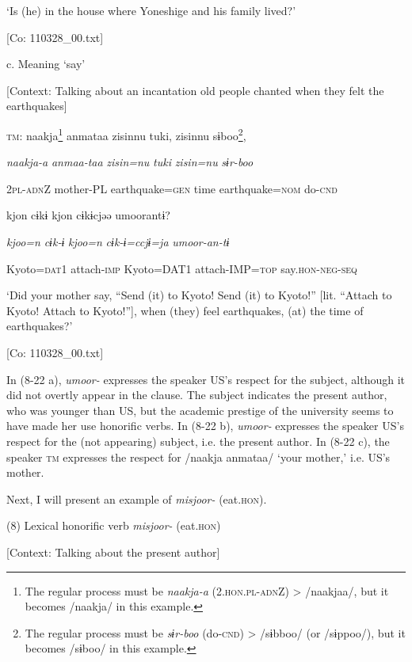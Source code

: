       ‘Is (he) in the house where Yoneshige and his family lived?’

      [Co: 110328\_00.txt]

  c.  Meaning ‘say’

    [Context: Talking about an incantation old people chanted when they felt the earthquakes]

    \textsc{tm}:  naakja\footnote{The regular process must be \textit{naakja-a} (2.\textsc{hon}.\textsc{pl}-\textsc{adn}Z) > /naakjaa/, but it becomes /naakja/ in this example.}  anmataa  zisinnu  tuki,  zisinnu  sɨboo\footnote{The regular process must be \textit{sɨr-boo} (do-\textsc{cnd}) > /sɨbboo/ (or /sɨppoo/), but it becomes /sɨboo/ in this example.},

      \textit{naakja-a}  \textit{anmaa-taa}  \textit{zisin=nu}  \textit{tuki}  \textit{zisin=nu}  \textit{sɨr-boo}

      2\textsc{pl}-\textsc{adn}Z  mother-PL  earthquake=\textsc{gen}  time  earthquake=\textsc{nom}  do-\textsc{cnd}

      kjon  cɨkɨ  kjon  cɨkɨcjəə  umoorantɨ?

      \textit{kjoo=n}  \textit{cɨk-ɨ}  \textit{kjoo=n}  \textit{cɨk-ɨ=ccjɨ=ja}  \textit{umoor{}-an-tɨ}

      Kyoto=\textsc{dat}1  attach-\textsc{imp}  Kyoto=DAT1  attach-IMP=\textsc{top}  say.\textsc{hon}-\textsc{neg}-\textsc{seq}

      ‘Did your mother say, “Send (it) to Kyoto! Send (it) to Kyoto!” [lit. “Attach to Kyoto! Attach to Kyoto!”], when (they) feel earthquakes, (at) the time of earthquakes?’

      [Co: 110328\_00.txt]

In (8-22 a), \textit{umoor-} expresses the speaker US’s respect for the subject, although it did not overtly appear in the clause. The subject indicates the present author, who was younger than US, but the academic prestige of the university seems to have made her use honorific verbs. In (8-22 b), \textit{umoor-} expresses the speaker US’s respect for the (not appearing) subject, i.e. the present author. In (8-22 c), the speaker \textsc{tm} expresses the respect for /naakja anmataa/ ‘your mother,’ i.e. US’s mother.

Next, I will present an example of \textit{misjoor-} (eat.\textsc{hon}).

(8)  Lexical honorific verb \textit{misjoor-} (eat.\textsc{hon})

  [Context: Talking about the present author]

